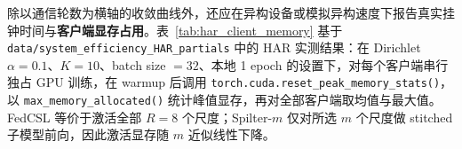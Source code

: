 \documentclass{article}
\begin{document}
除以通信轮数为横轴的收敛曲线外，还应在异构设备或模拟异构速度下报告真实挂钟时间与\textbf{客户端显存占用}。表~\ref{tab:har_client_memory} 基于 \texttt{data/system\_efficiency\_HAR\_partials} 中的 HAR 实测结果：在 Dirichlet $\alpha=0.1$、$K=10$、batch size $=32$、本地 1 epoch 的设置下，对每个客户端串行独占 GPU 训练，在 warmup 后调用 \texttt{torch.cuda.reset\_peak\_memory\_stats()}，以 \texttt{max\_memory\_allocated()} 统计峰值显存，再对全部客户端取均值与最大值。FedCSL 等价于激活全部 $R=8$ 个尺度；Spilter-$m$ 仅对所选 $m$ 个尺度做 stitched 子模型前向，因此激活显存随 $m$ 近似线性下降。

\begin{table}[htbp]
  \centering
  \caption{HAR 客户端本地训练峰值显存与最慢客户端单 epoch 耗时（Dirichlet $\alpha=0.1$，RTX 3090，$K=10$）。Mean / Max Peak Mem 为各客户端 1-epoch 峰值显存的均值 / 最大值；Mem Saving 与 Compress.\ Ratio 均以 FedCSL 为基准：Saving $=1-\bar M/\bar M_{\mathrm{FedCSL}}$，Compress.\ $=\bar M_{\mathrm{FedCSL}}/\bar M$。加粗为 Spilter 相对 FedCSL 的显存节省。}
  \label{tab:har_client_memory}
\end{table}
\end{document}
